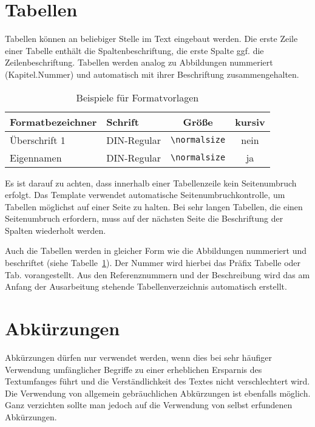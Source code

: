 \section{Tabellen}
\label{sec:tabellen}

Tabellen können an beliebiger Stelle im Text eingebaut werden. Die erste Zeile einer Tabelle enthält die Spaltenbeschriftung, die erste Spalte ggf. die Zeilenbeschriftung. Tabellen werden analog zu Abbildungen nummeriert (Kapitel.Nummer) und automatisch mit ihrer Beschriftung zusammengehalten.

\begin{table}[h]
	\centering
	\caption{Beispiele für Formatvorlagen}
	\label{tab:formatvorlagen}
	\begin{tabular}{|l|l|c|c|}
		\hline
		\textbf{Formatbezeichner} & \textbf{Schrift} & \textbf{Größe}                     & \textbf{kursiv} \\
		\hline
		Überschrift 1             & DIN-Regular      & \texttt{\textbackslash normalsize} & nein            \\
		Eigennamen                & DIN-Regular      & \texttt{\textbackslash normalsize} & ja              \\
		\hline
	\end{tabular}
\end{table}

Es ist darauf zu achten, dass innerhalb einer Tabellenzeile kein Seitenumbruch erfolgt. Das Template verwendet automatische Seitenumbruchkontrolle, um Tabellen möglichst auf einer Seite zu halten. Bei sehr langen Tabellen, die einen Seitenumbruch erfordern, muss auf der nächsten Seite die Beschriftung der Spalten wiederholt werden.

Auch die Tabellen werden in gleicher Form wie die Abbildungen nummeriert und beschriftet (siehe Tabelle~\ref{tab:formatvorlagen}). Der Nummer wird hierbei das Präfix Tabelle oder Tab. vorangestellt. Aus den Referenznummern und der Beschreibung wird das am Anfang der Ausarbeitung stehende Tabellenverzeichnis automatisch erstellt.

\section{Abkürzungen}
\label{sec:abkuerzungen}

Abkürzungen dürfen nur verwendet werden, wenn dies bei sehr häufiger Verwendung umfänglicher Begriffe zu einer erheblichen Ersparnis des Textumfanges führt und die Verständlichkeit des Textes nicht verschlechtert wird. Die Verwendung von allgemein gebräuchlichen Abkürzungen ist ebenfalls möglich. Ganz verzichten sollte man jedoch auf die Verwendung von selbst erfundenen Abkürzungen.

